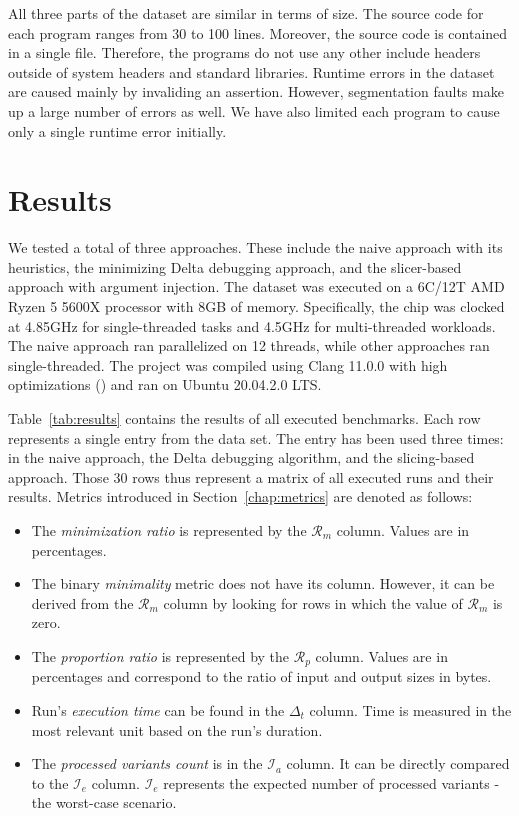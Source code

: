 All three parts of the dataset are similar in terms of size. 
The source code for each program ranges from 30 to 100 lines. 
Moreover, the source code is contained in a single file. 
Therefore, the programs do not use any other include headers outside of 
system headers and standard libraries. 
Runtime errors in the dataset are caused mainly by invaliding an assertion. 
However, segmentation faults make up a large number of errors as well. 
We have also limited each program to cause only a single runtime error 
initially.

\section{Results}

We tested a total of three approaches. 
These include the naive approach with its heuristics, the minimizing Delta 
debugging approach, and the slicer-based approach 
with argument injection. 
The dataset was executed on a 6C/12T AMD Ryzen 5 5600X processor with 8GB of 
memory. 
Specifically, the chip was clocked at 4.85GHz for single-threaded tasks and 
4.5GHz for multi-threaded workloads. 
The naive approach ran parallelized on 12 threads, while other approaches 
ran single-threaded. 
The project was compiled using Clang 11.0.0 with high optimizations 
() and ran on Ubuntu 20.04.2.0 LTS.

Table~\ref{tab:results} contains the results of all executed benchmarks. 
Each row represents a single entry from the data set. 
The entry has been used three times: in the naive approach, the Delta 
debugging algorithm, and the slicing-based approach. 
Those 30 rows thus represent a matrix of all executed runs and their results. 
Metrics introduced in Section~\ref{chap:metrics} are denoted as follows:
\begin{itemize}
  \item The \emph{minimization ratio} is represented by the $\mathcal{R}_m$ 
  column. 
  Values are in percentages.
  \item The binary \emph{minimality} metric does not have its column. 
  However, it can be derived from the $\mathcal{R}_m$ column by looking for 
  rows in which the value of $\mathcal{R}_m$ is zero.
  \item The \emph{proportion ratio} is represented by the $\mathcal{R}_p$ 
  column. 
  Values are in percentages and correspond to the ratio of input and output 
  sizes in bytes.
  \item Run's \emph{execution time} can be found in the $\Delta_t$ column. 
  Time is measured in the most relevant unit based on the run's duration.
  \item The \emph{processed variants count} is in the $\mathcal{I}_a$ column. 
  It can be directly compared to the $\mathcal{I}_e$ column. 
  $\mathcal{I}_e$ represents the expected number of processed variants - 
  the worst-case scenario.
\end{itemize}

